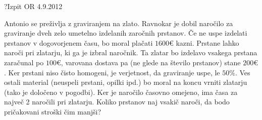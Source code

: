 \begin{naloga}{?}{Izpit OR 4.9.2012}
\begin{vprasanje}
Antonio se preživlja z graviranjem na zlato.
Ravnokar je dobil naročilo za graviranje
dveh zelo umetelno izdelanih zaročnih prstanov.
Če ne uspe izdelati prstanov v dogovorjenem času,
bo moral plačati $1600 €$ kazni.
Prstane lahko naroči pri zlatarju, ki ga je izbral naročnik.
Ta zlatar bo izdelavo vsakega prstana zaračunal po $100 €$,
varovana dostava pa (ne glede na število prstanov) stane $200 €$.
Ker prstani niso čisto homogeni,
je verjetnost, da graviranje uspe, le $50 \%$.
Ves ostali material (neuspeli prstani, opilki ipd.)
bo moral na koncu vrniti zlatarju (tako je določeno v pogodbi).
Ker je naročilo časovno omejeno, ima časa za največ 2 naročili pri zlatarju.
Koliko prstanov naj vsakič naroči, da bodo pričakovani stroški čim manjši?
\end{vprasanje}
\begin{odgovor}
\end{odgovor}
\end{naloga}
